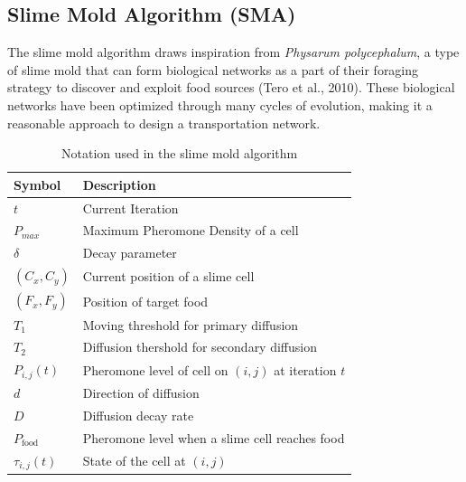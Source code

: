 \documentclass[11pt]{article}
\begin{document}
\subsection{Slime Mold Algorithm (SMA)}
The slime mold algorithm draws inspiration from \textit{Physarum polycephalum}, a type of slime mold that can form biological networks as a part of their foraging strategy to discover and exploit food sources (Tero et al., 2010). These biological networks have been optimized through many cycles of evolution, making it a reasonable approach to design a transportation network.  \\
\begin{table}[H]
\begin{center}
\begin{tabular}{|l|l|}
\hline
\textbf{Symbol} & \textbf{Description}               \\ \hline
$t$                              & Current Iteration                                   \\ \hline
$P_{max}$                        & Maximum Pheromone Density of a cell                 \\ \hline
$\delta$                         & Decay parameter                                     \\ \hline
$(C_x,C_y)$                      & Current position of a slime cell                    \\ \hline
$(F_x,F_y)$                      & Position of target food                             \\ \hline
$T_1$                            & Moving threshold for primary diffusion              \\ \hline
$T_2$                            & Diffusion thershold for secondary diffusion         \\ \hline
$P_{i,j}(t)$                     & Pheromone level of cell on $(i,j)$ at iteration $t$ \\ \hline
$d$                              & Direction of diffusion                              \\ \hline
$D$                              & Diffusion decay rate                                \\ \hline
$P_{\mathrm{food}}$                       & Pheromone level when a slime cell reaches food      \\ \hline
$\tau_{i,j}\left(t\right)$                       & State of the cell at $(i,j)$      \\ \hline
\end{tabular}
\caption{Notation used in the slime mold algorithm}
\end{center}
\end{table}
\end{document}
